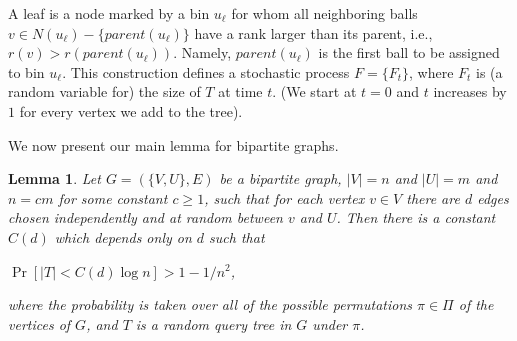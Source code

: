 \documentclass[english, oribibl]{llncs}
\newtheorem{lemma}[theorem]{Lemma}
\begin{document}
A leaf is a node marked by a bin $u_\ell$ for whom all neighboring balls $v\in N(u_\ell)-\{parent(u_\ell)\}$ have a rank larger than its parent, i.e., $r(v)>r(parent(u_\ell))$. Namely, $parent(u_\ell)$ is the first ball to be assigned to bin $u_\ell$.
This construction defines a stochastic process $F = \{F_t\}$,
where $F_t$ is (a random variable for) the size of $T$ at time $t$. (We start at $t=0$ and $t$ increases by $1$ for every vertex we add to the tree).

We now present our main lemma for bipartite graphs.
\begin{lemma}
\label{lemma:bipartite}
Let $G=(\{V,U\},E)$ be a bipartite graph, $|V| = n$ and $|U| = m$ and $n= cm$ for some constant $c\geq 1$, such that for each
vertex $v \in V$ there are $d$ edges chosen independently and at random between $v$ and $U$. Then there is a constant
$C(d)$ which depends only on $d$ such that 
\begin{center}
$\Pr[|T|<C(d) \log{n}]>1-1/n^2$,
\end{center}
where the probability is taken over all of the possible permutations $\pi \in \Pi$ of the vertices of $G$, and $T$ is a random query tree in $G$ under $\pi$.
\end{lemma}


























\begin{comment}
We define the following local version of this problem:
Given $m$ balls, $B = \{b_1, \cdots,  b_m\}$
(each with a rank chosen uniformly at random from $[0,1]$) and  $n$ bins, and $d$ choices for each ball,
for each query $b \in B$, find a consistent allocation for $b$ such that the maximum load on the bins is minimized.
Recall that by \emph{consistent} we mean that for each query the output is consistent with some global
allocation $\mathcal{A}$, in which the maximum load is minimized.
We refer to this problem as \emph{Local Balls and Bins} problem.
\end{comment}


\label{bipartite_proof}
\end{document}

